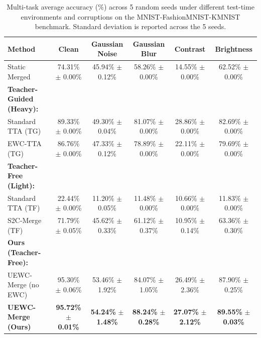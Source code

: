 \documentclass{article}
\theoremstyle{plain}
\theoremstyle{definition}
\theoremstyle{remark}
\begin{document}
\begin{table}[t]
\caption{Multi-task average accuracy (\%) across 5 random seeds under different test-time environments and corruptions on the MNIST-FashionMNIST-KMNIST benchmark. Standard deviation is reported across the 5 seeds.}
\label{tab:results}
\begin{center}
\begin{small}
\begin{sc}
\begin{tabular}{lccccc}
\toprule
Method & Clean & Gaussian Noise & Gaussian Blur & Contrast & Brightness \\
\midrule
Static Merged & 74.31\% $\pm$ 0.00\% & 45.94\% $\pm$ 0.12\% & 58.26\% $\pm$ 0.00\% & 14.55\% $\pm$ 0.00\% & 62.52\% $\pm$ 0.00\% \\
\midrule
\textbf{Teacher-Guided (Heavy):} \\
Standard TTA (TG) & 89.33\% $\pm$ 0.00\% & 49.30\% $\pm$ 0.04\% & 81.07\% $\pm$ 0.00\% & 28.86\% $\pm$ 0.00\% & 82.69\% $\pm$ 0.00\% \\
EWC-TTA (TG) & 86.76\% $\pm$ 0.00\% & 47.33\% $\pm$ 0.12\% & 78.89\% $\pm$ 0.00\% & 22.11\% $\pm$ 0.00\% & 79.69\% $\pm$ 0.00\% \\
\midrule
\textbf{Teacher-Free (Light):} \\
Standard TTA (TF) & 22.44\% $\pm$ 0.00\% & 11.20\% $\pm$ 0.05\% & 11.48\% $\pm$ 0.00\% & 10.66\% $\pm$ 0.00\% & 11.83\% $\pm$ 0.00\% \\
S2C-Merge (TF) & 71.79\% $\pm$ 0.05\% & 45.62\% $\pm$ 0.33\% & 61.12\% $\pm$ 0.37\% & 10.95\% $\pm$ 0.14\% & 63.36\% $\pm$ 0.30\% \\
\midrule
\textbf{Ours (Teacher-Free):} \\
UEWC-Merge (no EWC) & 95.30\% $\pm$ 0.06\% & 53.46\% $\pm$ 1.92\% & 84.07\% $\pm$ 1.05\% & 26.49\% $\pm$ 2.36\% & 87.90\% $\pm$ 0.25\% \\
\textbf{UEWC-Merge (Ours)} & \textbf{95.72\%} $\pm$ \textbf{0.01\%} & \textbf{54.24\%} $\pm$ \textbf{1.48\%} & \textbf{88.24\%} $\pm$ \textbf{0.28\%} & \textbf{27.07\%} $\pm$ \textbf{2.12\%} & \textbf{89.55\%} $\pm$ \textbf{0.03\%} \\
\bottomrule
\end{tabular}
\end{sc}
\end{small}
\end{center}
\vskip -0.1in
\end{table}
\end{document}
